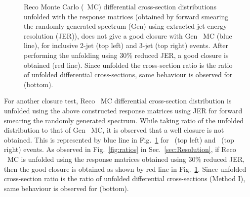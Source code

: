\begin{figure}[!h]
\begin{center}
 \caption[Reco differential cross-section distributions unfolded with the response matrices.]{Reco \MadGraphFn\plusn \PYTHIAS Monte Carlo (\MGP~MC) differential cross-section distributions unfolded with the response matrices (obtained by forward smearing the randomly generated spectrum (Gen) using extracted jet energy resolution (JER)), does not give a good closure with Gen \MGP~MC (blue line), for inclusive 2-jet (top left) and 3-jet (top right) events. After performing the unfolding using 30\% reduced JER, a good closure is obtained (red line). Since unfolded the cross-section ratio \ratio is the ratio of unfolded differential cross-sections, same behaviour is observed for \ratio (bottom).}
 \label{fig:unfolded_reco_NLO}
 \end{center}
\end{figure}

For another closure test, Reco \MGP~MC differential cross-section distribution is unfolded using the above constructed response matrices using JER for forward smearing the randomly generated spectrum. While taking ratio of the unfolded distribution to that of Gen \MGP~MC, it is observed that a well closure is not obtained. This is represented by blue line in Fig.~\ref{fig:unfolded_reco_NLO} for \njt~(top left) and \njth~(top right) events. As observed in Fig.~\ref{fig:ratios} in Sec.~\ref{sec:Resolution}, if Reco \MGP~MC is unfolded using the response matrices obtained using 30\% reduced JER, then the good closure is obtained as shown by red line in Fig.~\ref{fig:unfolded_reco_NLO}. Since unfolded cross-section ratio \ratio is the ratio of unfolded differential cross-sections (Method I), same behaviour is observed for \ratio (bottom). 

